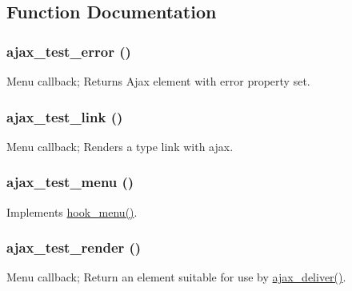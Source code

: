 \subsection{Function Documentation}
\hypertarget{ajax__test_8module_aa58a78423b7574f07be000292f81674c}{
\subsubsection[{ajax\_\-test\_\-error}]{\setlength{\rightskip}{0pt plus 5cm}ajax\_\-test\_\-error ()}}
\label{ajax__test_8module_aa58a78423b7574f07be000292f81674c}
Menu callback; Returns Ajax element with error property set. \hypertarget{ajax__test_8module_a43d54162adad14aeab868fdd2ff797e2}{
\subsubsection[{ajax\_\-test\_\-link}]{\setlength{\rightskip}{0pt plus 5cm}ajax\_\-test\_\-link ()}}
\label{ajax__test_8module_a43d54162adad14aeab868fdd2ff797e2}
Menu callback; Renders a type link with ajax. \hypertarget{ajax__test_8module_a66ae95385470f8f931d2889fcf741683}{
\subsubsection[{ajax\_\-test\_\-menu}]{\setlength{\rightskip}{0pt plus 5cm}ajax\_\-test\_\-menu ()}}
\label{ajax__test_8module_a66ae95385470f8f931d2889fcf741683}
Implements \hyperlink{group__hooks_ga5c95244fea59b25666e409759e133ded}{hook\_\-menu()}. \hypertarget{ajax__test_8module_a9fb31d7b9cb56d274b778a8a8c0fa925}{
\subsubsection[{ajax\_\-test\_\-render}]{\setlength{\rightskip}{0pt plus 5cm}ajax\_\-test\_\-render ()}}
\label{ajax__test_8module_a9fb31d7b9cb56d274b778a8a8c0fa925}
Menu callback; Return an element suitable for use by \hyperlink{group__ajax_ga44a56b3660e97b39f87535a9a2bc8d8a}{ajax\_\-deliver()}.


